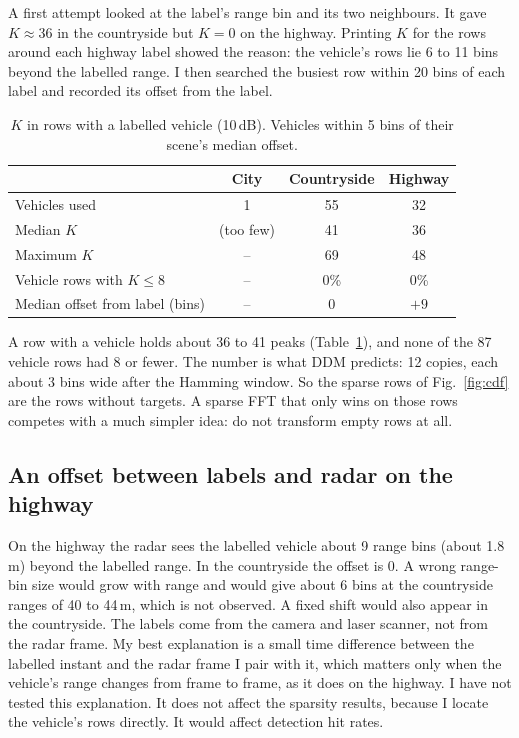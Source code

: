 \documentclass[10pt,a4paper]{article}
\begin{document}
A first attempt looked at the label's range bin and its two neighbours. It gave $K \approx 36$ in the countryside but $K = 0$ on the highway. Printing $K$ for the rows around each highway label showed the reason: the vehicle's rows lie 6 to 11 bins beyond the labelled range. I then searched the busiest row within 20 bins of each label and recorded its offset from the label.

\begin{table}[h]
\caption{$K$ in rows with a labelled vehicle (10\,dB). Vehicles within 5 bins of their scene's median offset.}
\label{tab:vehicle}
\centering
\begin{tabular}{lccc}
\toprule
 & City & Countryside & Highway \\
\midrule
Vehicles used & 1 & 55 & 32 \\
Median $K$ & (too few) & 41 & 36 \\
Maximum $K$ & -- & 69 & 48 \\
Vehicle rows with $K \le 8$ & -- & 0\% & 0\% \\
Median offset from label (bins) & -- & 0 & $+9$ \\
\bottomrule
\end{tabular}
\end{table}

A row with a vehicle holds about 36 to 41 peaks (Table~\ref{tab:vehicle}), and none of the 87 vehicle rows had 8 or fewer. The number is what DDM predicts: 12 copies, each about 3 bins wide after the Hamming window. So the sparse rows of Fig.~\ref{fig:cdf} are the rows without targets. A sparse FFT that only wins on those rows competes with a much simpler idea: do not transform empty rows at all.

\subsection{An offset between labels and radar on the highway}
On the highway the radar sees the labelled vehicle about 9 range bins (about 1.8\,m) beyond the labelled range. In the countryside the offset is 0. A wrong range-bin size would grow with range and would give about 6 bins at the countryside ranges of 40 to 44\,m, which is not observed. A fixed shift would also appear in the countryside. The labels come from the camera and laser scanner, not from the radar frame. My best explanation is a small time difference between the labelled instant and the radar frame I pair with it, which matters only when the vehicle's range changes from frame to frame, as it does on the highway. I have not tested this explanation. It does not affect the sparsity results, because I locate the vehicle's rows directly. It would affect detection hit rates.
\end{document}
